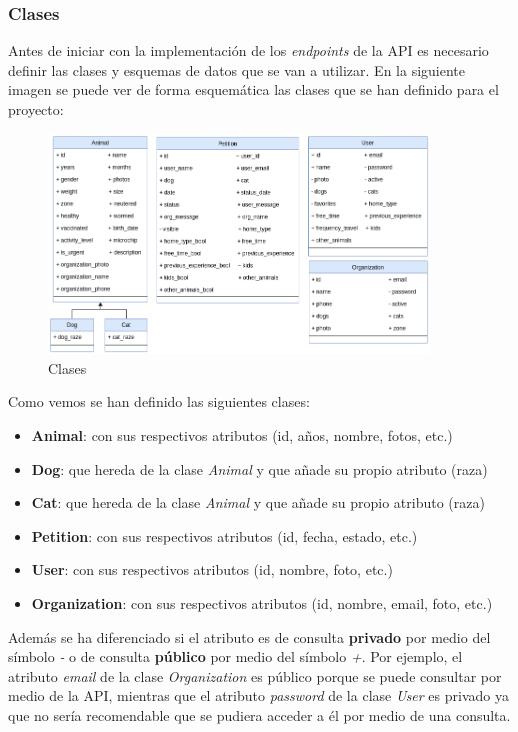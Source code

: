 \subsubsection{Clases}\label{subsubsec:clases}

Antes de iniciar con la implementación de los \textit{endpoints} de la API es necesario definir las clases y esquemas de datos
que se van a utilizar. En la siguiente imagen se puede ver de forma esquemática las clases que se han definido para el proyecto:

\begin{figure}[H]
    \centering
    \includegraphics[width=0.9\textwidth]{imgs/clases.png}
    \caption{Clases}
    \label{fig:clases}
\end{figure}

Como vemos se han definido las siguientes clases:

\begin{itemize}
    \item \textbf{Animal}: con sus respectivos atributos (id, años, nombre, fotos, etc.)
    \item \textbf{Dog}: que hereda de la clase \textit{Animal} y que añade su propio atributo (raza)
    \item \textbf{Cat}: que hereda de la clase \textit{Animal} y que añade su propio atributo (raza)
    \item \textbf{Petition}: con sus respectivos atributos (id, fecha, estado, etc.)
    \item \textbf{User}: con sus respectivos atributos (id, nombre, foto, etc.)
    \item \textbf{Organization}: con sus respectivos atributos (id, nombre, email, foto, etc.)
\end{itemize}

Además se ha diferenciado si el atributo es de consulta \textbf{privado} por medio del símbolo \textit{-} o de consulta
\textbf{público} por medio del símbolo \textit{+}. Por ejemplo, el atributo \textit{email} de la clase \textit{Organization}
es público porque se puede consultar por medio de la API, mientras que el atributo \textit{password} de la clase
\textit{User} es privado ya que no sería recomendable que se pudiera acceder a él por medio de una consulta.

